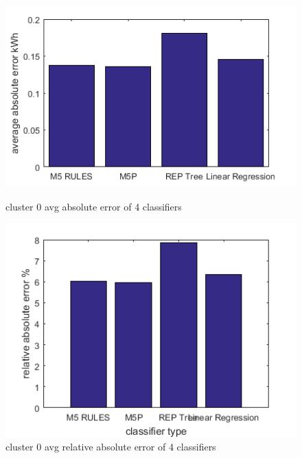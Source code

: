 \begin{figure}
\centering
\begin{minipage}{.5\textwidth}
  \centering
  \includegraphics[width=\linewidth]{cluster-0-diff-classifier-avg-abs.png}
  \caption{cluster 0 avg absolute error of 4 classifiers}
  \label{fig:cluster-0-predictors}
\end{minipage}%
\begin{minipage}{.5\textwidth}
  \centering
  \includegraphics[width=\linewidth]{cluster-0-diff-classifier-relative-abs.png}
  \caption{cluster 0 avg relative absolute error of 4 classifiers}
\end{minipage}


\end{figure}
